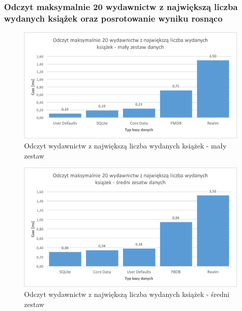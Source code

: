 \subsubsection{Odczyt maksymalnie 20 wydawnictw z największą liczba wydanych książek oraz posrotowanie wyniku rosnąco}

\begin{figure}[H]
\centering
	\includegraphics[width=13.5cm]{img/read_data/read_by_publishers/read_by_publishers_small_test.png}
	\caption{Odczyt wydawnictw z największą liczba wydanych książek - mały zestaw}
	\label{fig: read-by-publishers-small}
\end{figure}

\begin{figure}[H]
\centering
	\includegraphics[width=13.5cm]{img/read_data/read_by_publishers/read_by_publishers_medium_test.png}
	\caption{Odczyt wydawnictw z największą liczba wydanych książek - średni zestaw}
	\label{fig: read-by-publishers-medium}
\end{figure}


